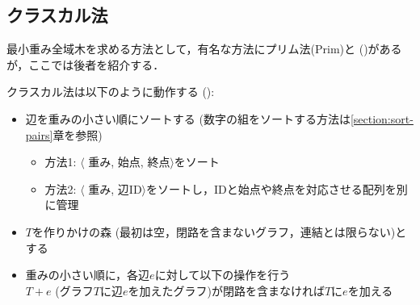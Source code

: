 \subsection{クラスカル法}

最小重み全域木を求める方法として，有名な方法にプリム法(Prim)と ()があるが，ここでは後者を紹介する．

クラスカル法は以下のように動作する (\pccbook[pp.~101--]):
\begin{itemize}
\setlength{\itemsep}{0pt}
\item 辺を重みの小さい順にソートする (数字の組をソートする方法は\ref{section:sort-pairs}章を参照)
          \begin{itemize}
          \item 方法1: $\langle$ 重み, 始点, 終点$\rangle$をソート
          \item 方法2: $\langle$ 重み, 辺ID$\rangle$をソートし，IDと始点や終点を対応させる配列を別に管理
          \end{itemize}
\item $T$を作りかけの森 (最初は空，閉路を含まないグラフ，連結とは限らない)とする
\item 重みの小さい順に，各辺$e$に対して以下の操作を行う\\
 $T+e$ (グラフ$T$に辺$e$を加えたグラフ)が閉路を含まなければ$T$に$e$を加える
\end{itemize}

